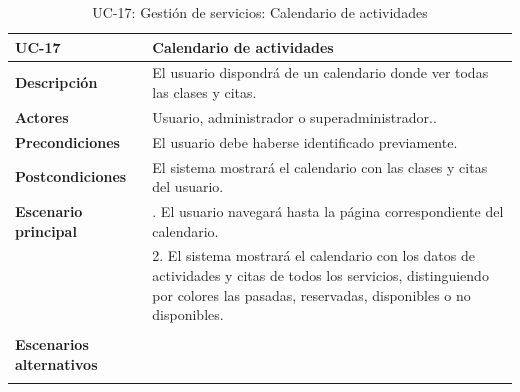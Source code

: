 \begin{table}[H]
  \begin{center}
    \begin{tabularx}{16.4cm}{|l|X|}
      \hline
      \textbf{UC-17} & \textbf{Calendario de actividades}\\
      \hline
      \textbf{Descripción} & El usuario dispondrá de un calendario donde ver todas las clases y citas. \\
      \hline
      \textbf{Actores} & Usuario, administrador o superadministrador..\\
      \hline
      \textbf{Precondiciones} & El usuario debe haberse identificado previamente.\\
      \hline
      \textbf{Postcondiciones} & El sistema mostrará el calendario con las clases y citas del usuario.\\
      \hline
      \textbf{Escenario principal} & \smallskip 1. El usuario navegará hasta la página correspondiente del calendario.\\
      & 2. El sistema mostrará el calendario con los datos de actividades y citas de todos los servicios, distinguiendo por colores las pasadas, reservadas, disponibles o no disponibles.\\
      & \\
      \hline
      \textbf{Escenarios alternativos} & \\
      & \\
      \hline
    \end{tabularx}
    \caption{UC-17: Gestión de servicios: Calendario de actividades}
    \label{tab:CU-calendario}
  \end{center}
\end{table}


